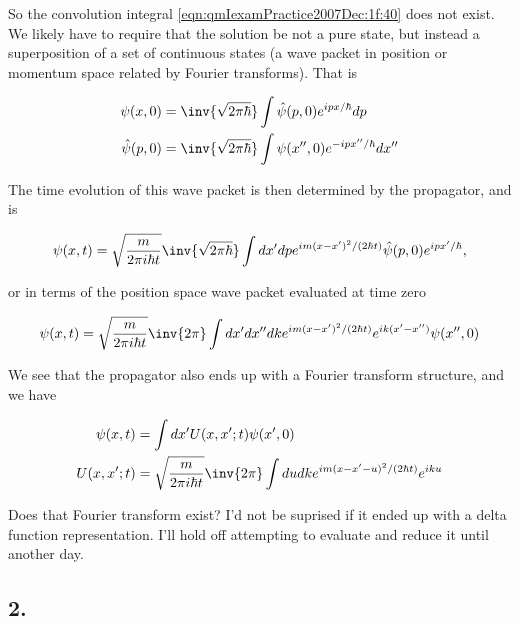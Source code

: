 So the convolution integral \ref{eqn:qmIexamPractice2007Dec:1f:40} does not exist.  We likely have to require that the solution be not a pure state, but instead a superposition of a set of continuous states (a wave packet in position or momentum space related by Fourier transforms).  That is

\begin{align}\label{eqn:qmIexamPractice2007Dec:1f:60}
\psi(x, 0) &= 
\inv{\sqrt{2 \pi \hbar}} \int \hat{\psi}(p, 0) e^{i p x/\hbar} dp \\
\hat{\psi}(p, 0) &= 
\inv{\sqrt{2 \pi \hbar}} \int \psi(x'', 0) e^{-i p x''/\hbar} dx''
\end{align}

The time evolution of this wave packet is then determined by the propagator, and is

\begin{equation}\label{eqn:qmIexamPractice2007Dec:1f:70}
\psi(x,t) =
\sqrt{\frac{m}{2 \pi i \hbar t}} 
\inv{\sqrt{2 \pi \hbar}} 
\int dx' dp
e^{i m (x-x')^2/ (2 \hbar t)}
\hat{\psi}(p, 0) e^{i p x'/\hbar} ,
\end{equation}

or in terms of the position space wave packet evaluated at time zero

\begin{equation}\label{eqn:qmIexamPractice2007Dec:1f:80}
\psi(x,t) =
\sqrt{\frac{m}{2 \pi i \hbar t}}
\inv{2 \pi}
\int dx' dx'' dk
e^{i m (x-x')^2/ (2 \hbar t)}
e^{i k (x' - x'')} \psi(x'', 0)
\end{equation}

We see that the propagator also ends up with a Fourier transform structure, and we have

\begin{align}\label{eqn:qmIexamPractice2007Dec:1f:90}
\psi(x,t) &= \int dx' U(x, x' ; t) \psi(x', 0) \\
U(x, x' ; t) &=
\sqrt{\frac{m}{2 \pi i \hbar t}}
\inv{2 \pi}
\int du dk
e^{i m (x - x' - u)^2/ (2 \hbar t)}
e^{i k u }
\end{align}

Does that Fourier transform exist?  I'd not be suprised if it ended up with a delta function representation.  I'll hold off attempting to evaluate and reduce it until another day.

\subsection{2.}

\EndNoBibArticle
